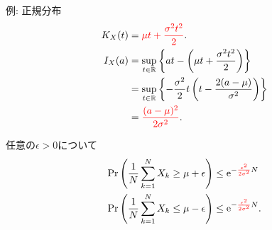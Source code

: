 \documentclass[lualatex,handout]{beamer}
\newcommand{\emm}[1]{\textcolor{red}{#1}}
\theoremstyle{definition}
\begin{document}
\begin{frame}{例: 正規分布}
\begin{align*}
K_X(t) &= \emm{\mu t + \frac{\sigma^2t^2}2}.\\
I_X(a)&=\sup_{t\in\mathbb{R}} \left\{at - \left(\mu t + \frac{\sigma^2t^2}2\right)\right\}\\
&= \sup_{t\in\mathbb{R}} \left\{-\frac{\sigma^2}2 t\left(t-\frac{2(a-\mu)}{\sigma^2}\right) \right\}\\
&=\emm{\frac{(a-\mu)^2}{2\sigma^2}}.
\end{align*}

\vspace{1em}
任意の$\epsilon>0$について
\begin{align*}
\Pr\left(\frac1N\sum_{k=1}^N X_k \ge \mu + \epsilon\right) &\le \mathrm{e}^{-\emm{\frac{\epsilon^2}{2\sigma^2}}N}\\
\Pr\left(\frac1N\sum_{k=1}^N X_k \le \mu - \epsilon\right) &\le \mathrm{e}^{-\emm{\frac{\epsilon^2}{2\sigma^2}}N}.
\end{align*}
\end{frame}
\end{document}
